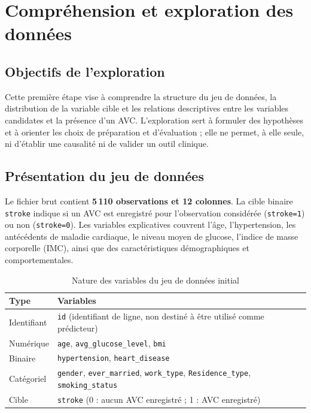 \chapter{Compréhension et exploration des données}
\label{chap:eda}
\thispagestyle{plain}

\section{Objectifs de l'exploration}
Cette première étape vise à comprendre la structure du jeu de données, la distribution de la variable cible et les relations descriptives entre les variables candidates et la présence d'un AVC. L'exploration sert à formuler des hypothèses et à orienter les choix de préparation et d'évaluation ; elle ne permet, à elle seule, ni d'établir une causalité ni de valider un outil clinique.

\section{Présentation du jeu de données}
Le fichier brut contient \textbf{5\,110 observations et 12 colonnes}. La cible binaire \texttt{stroke} indique si un AVC est enregistré pour l'observation considérée (\texttt{stroke=1}) ou non (\texttt{stroke=0}). Les variables explicatives couvrent l'âge, l'hypertension, les antécédents de maladie cardiaque, le niveau moyen de glucose, l'indice de masse corporelle (IMC), ainsi que des caractéristiques démographiques et comportementales.

\begin{table}[H]
    \centering
    \caption{Nature des variables du jeu de données initial}
    \label{tab:eda-variable-types}
    \renewcommand{\arraystretch}{1.2}
    \begin{tabularx}{\textwidth}{@{}>{\raggedright\arraybackslash}p{3.1cm}X@{}}
        \toprule
        \textbf{Type} & \textbf{Variables}\\
        \midrule
        Identifiant & \texttt{id} (identifiant de ligne, non destiné à être utilisé comme prédicteur)\\
        Numérique & \texttt{age}, \texttt{avg\_glucose\_level}, \texttt{bmi}\\
        Binaire & \texttt{hypertension}, \texttt{heart\_disease}\\
        Catégoriel & \texttt{gender}, \texttt{ever\_married}, \texttt{work\_type}, \texttt{Residence\_type}, \texttt{smoking\_status}\\
        Cible & \texttt{stroke} (0 : aucun AVC enregistré ; 1 : AVC enregistré)\\
        \bottomrule
    \end{tabularx}
\end{table}

